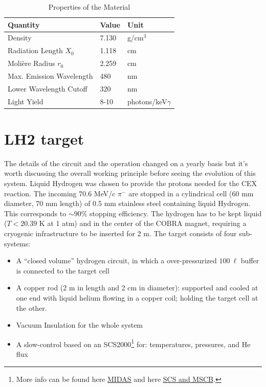 \begin{refsection}
    \begin{table}[]
        \centering
        \caption{Properties of the Material}
        \label{tab:BGO:properties}
        \begin{tabular}{@{}lll@{}}
        \toprule
        \textbf{Quantity}            & \textbf{Value} & \textbf{Unit} \\ \midrule
        Density                      & 7.130          & g/cm$^3$      \\
        Radiation Length $X_0$      & 1.118          & cm            \\
        Molière Radius $r_0$        & 2.259          & cm            \\
        Max. Emission Wavelength    & 480            & nm            \\
        Lower Wavelength Cutoff     & 320            & nm            \\
        Light Yield                 & 8-10           & photons/keV$\gamma$ \\ \bottomrule
        \end{tabular}
    \end{table}

\section{LH2 target}
    The details of the circuit and the operation changed on a yearly basis but it's worth discussing the overall working principle before seeing the evolution of this system.
    Liquid Hydrogen was chosen to provide the protons needed for the CEX reaction.  
    The incoming 70.6 MeV/c $\pi^-$ are stopped in a cylindrical cell (60 mm diameter, 70 mm length) of 0.5 mm stainless steel containing liquid Hydrogen. 
    This corresponds to $\sim 90\%$ stopping efficiency.
    The hydrogen has to be kept liquid ($T<20.39$ K at 1 atm) and in the center of the COBRA magnet, requiring a cryogenic infrastructure to be inserted for 2 m.
    The target consists of four sub-systems:
    \begin{itemize}
        \item A ``closed volume'' hydrogen circuit, in which a over-pressurized $100\ \ell$ buffer is connected to the target cell 
        \item  A copper rod (2 m in length and 2 cm in diameter): supported and cooled at one end with liquid helium flowing in a copper coil; holding the target cell at the other.
        \item Vacuum Insulation for the whole system
        \item A slow-control based on an SCS2000\footnote{More info can be found here \href{https://daq00.triumf.ca/MidasWiki/index.php/Main_Page}{\underline{MIDAS}} and here \href{https://www.psi.ch/en/ltp-electronics/www-documents}{\underline{SCS and MSCB}}.} for: temperatures, pressures, and He flux
    \end{itemize}
    

\end{refsection}
